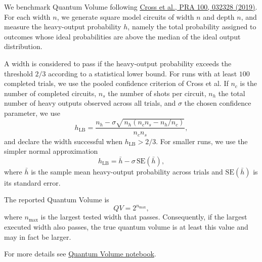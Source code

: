 We benchmark Quantum Volume following \href{https://journals.aps.org/pra/abstract/10.1103/PhysRevA.100.032328}{Cross et al., PRA 100, 032328 (2019)}. For each width \(n\), we generate square model circuits of width \(n\) and depth \(n\), and measure the heavy-output probability \(h\), namely the total probability assigned to outcomes whose ideal probabilities are above the median of the ideal output distribution.

A width is considered to pass if the heavy-output probability exceeds the threshold \(2/3\) according to a statistical lower bound. For runs with at least \(100\) completed trials, we use the pooled confidence criterion of Cross et al. If \(n_c\) is the number of completed circuits, \(n_s\) the number of shots per circuit, \(n_h\) the total number of heavy outputs observed across all trials, and \(\sigma\) the chosen confidence parameter, we use
\[
h_{\mathrm{LB}}
=
\frac{n_h - \sigma \sqrt{\,n_h\!\left(n_c n_s - n_h/n_c\right)}}{n_c n_s},
\]
and declare the width successful when \(h_{\mathrm{LB}} > 2/3\). For smaller runs, we use the simpler normal approximation
\[
h_{\mathrm{LB}} = \bar{h} - \sigma \,\mathrm{SE}(\bar{h}),
\]
where \(\bar{h}\) is the sample mean heavy-output probability across trials and \(\mathrm{SE}(\bar{h})\) is its standard error.

The reported Quantum Volume is
\[
QV = 2^{n_{\max}},
\]
where \(n_{\max}\) is the largest tested width that passes. Consequently, if the largest executed width also passes, the true quantum volume is at least this value and may in fact be larger.
\smallskip

For more details see \href{https://github.com/Classiq/classiq-library/tree/main/benchmarking/protocols/quantum\_volume\_protocol.ipynb}{Quantum Volume notebook}.
\medskip
